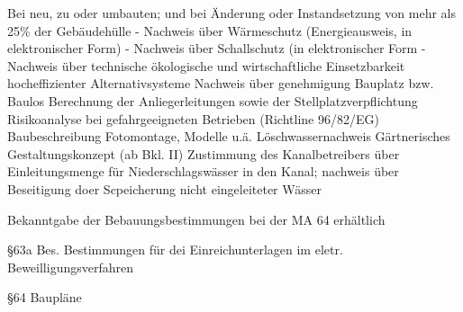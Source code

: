 \begin{tcolorbox}[colback=lightgray!5!lightgray,colframe=lightgray!75!black,title=\textbf{Je nach Bauvorhaben erforderlich}]
Bei neu, zu oder umbauten; und bei Änderung oder Instandsetzung von mehr als 25\% der Gebäudehülle\newline
- Nachweis über Wärmeschutz (Energieausweis, in elektronischer Form)\newline
- Nachweis über Schallschutz (in elektronischer Form\newline
- Nachweis über technische ökologische und wirtschaftliche Einsetzbarkeit hocheffizienter Alternativsysteme\newline
Nachweis über genehmigung Bauplatz bzw. Baulos\newline
Berechnung der Anliegerleitungen sowie der Stellplatzverpflichtung\newline
Risikoanalyse bei gefahrgeeigneten Betrieben (Richtline 96/82/EG) \newline
Baubeschreibung\newline
Fotomontage, Modelle u.ä.\newline
Löschwassernachweis\newline
Gärtnerisches Gestaltungskonzept (ab Bkl. II)\newline
Zustimmung des Kanalbetreibers über Einleitungsmenge für Niederschlagswässer in den Kanal; nachweis über Beseitigung doer Scpeicherung nicht eingeleiteter Wässer
\end{tcolorbox}

\begin{tcolorbox}[colback=lightgray!5!lightgray,colframe=lightgray!75!black, title=\textbf{Vom Bauleiter frei wählbar}]
Bekanntgabe der Bebauungsbestimmungen bei der MA 64 erhältlich
\end{tcolorbox}

§63a Bes. Bestimmungen für dei Einreichunterlagen im eletr. Beweilligungsverfahren
§64 Baupläne

